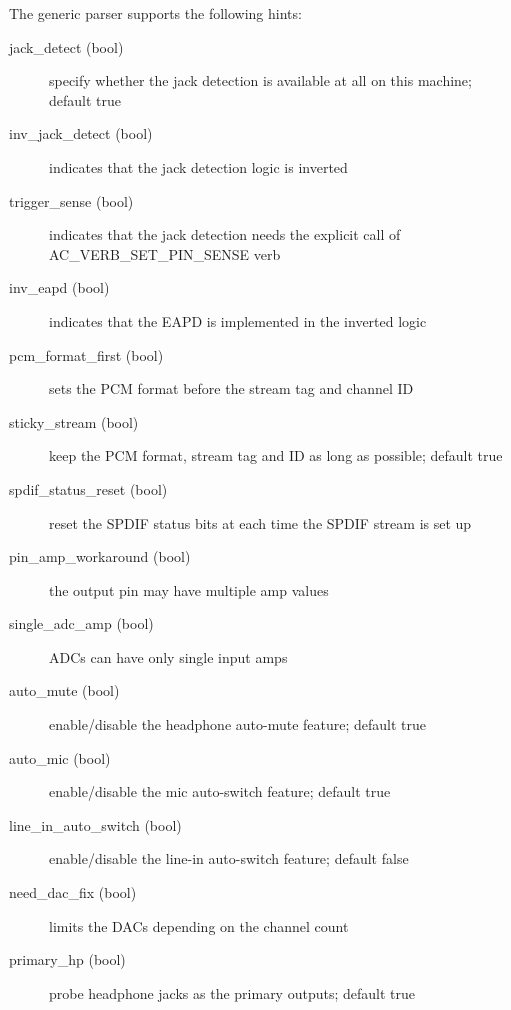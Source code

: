 \documentclass[a4paper,8pt,english]{sphinxmanual}
\begin{document}
The generic parser supports the following hints:
\begin{description}
\item[{jack\_detect (bool)}] \leavevmode
specify whether the jack detection is available at all on this
machine; default true

\item[{inv\_jack\_detect (bool)}] \leavevmode
indicates that the jack detection logic is inverted

\item[{trigger\_sense (bool)}] \leavevmode
indicates that the jack detection needs the explicit call of
AC\_VERB\_SET\_PIN\_SENSE verb

\item[{inv\_eapd (bool)}] \leavevmode
indicates that the EAPD is implemented in the inverted logic

\item[{pcm\_format\_first (bool)}] \leavevmode
sets the PCM format before the stream tag and channel ID

\item[{sticky\_stream (bool)}] \leavevmode
keep the PCM format, stream tag and ID as long as possible;
default true

\item[{spdif\_status\_reset (bool)}] \leavevmode
reset the SPDIF status bits at each time the SPDIF stream is set
up

\item[{pin\_amp\_workaround (bool)}] \leavevmode
the output pin may have multiple amp values

\item[{single\_adc\_amp (bool)}] \leavevmode
ADCs can have only single input amps

\item[{auto\_mute (bool)}] \leavevmode
enable/disable the headphone auto-mute feature; default true

\item[{auto\_mic (bool)}] \leavevmode
enable/disable the mic auto-switch feature; default true

\item[{line\_in\_auto\_switch (bool)}] \leavevmode
enable/disable the line-in auto-switch feature; default false

\item[{need\_dac\_fix (bool)}] \leavevmode
limits the DACs depending on the channel count

\item[{primary\_hp (bool)}] \leavevmode
probe headphone jacks as the primary outputs; default true


\end{description}
\end{document}

